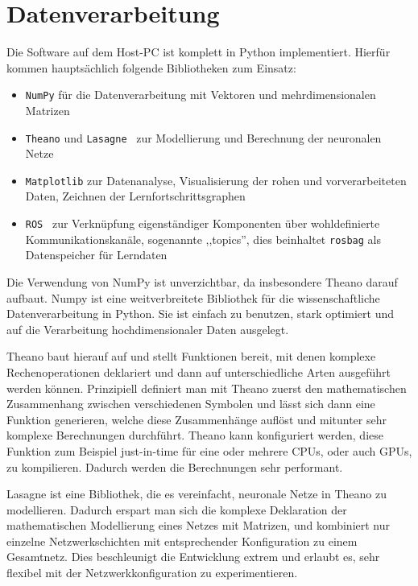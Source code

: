 \section{Datenverarbeitung}

Die Software auf dem Host-PC ist komplett in Python implementiert. Hierfür
kommen hauptsächlich folgende Bibliotheken zum Einsatz:

\begin{itemize}
    \item \texttt{NumPy} \citep{numpy} für die Datenverarbeitung mit Vektoren und
        mehrdimensionalen Matrizen
    \item \texttt{Theano} \citep{theano} und
        \texttt{Lasagne}~\cite{web:lasagne} zur Modellierung und Berechnung der
        neuronalen Netze
    \item \texttt{Matplotlib} \citep{matplotlib} zur Datenanalyse,
        Visualisierung der rohen und vorverarbeiteten Daten, Zeichnen der
        Lernfortschrittsgraphen
    \item \texttt{ROS}~\cite{web:ros} zur Verknüpfung eigenständiger Komponenten über
        wohldefinierte Kommunikationskanäle, sogenannte ,,topics'', dies beinhaltet
        \texttt{rosbag} als Datenspeicher für Lerndaten
\end{itemize}

Die Verwendung von NumPy ist unverzichtbar, da insbesondere
Theano darauf aufbaut. Numpy ist eine weitverbreitete Bibliothek für
die wissenschaftliche Datenverarbeitung in Python. Sie ist einfach zu benutzen,
stark optimiert und auf die Verarbeitung hochdimensionaler Daten ausgelegt.

Theano baut hierauf auf und stellt Funktionen bereit, mit denen
komplexe Rechenoperationen deklariert und dann auf unterschiedliche Arten
ausgeführt werden können. Prinzipiell definiert man mit Theano zuerst den
mathematischen Zusammenhang zwischen verschiedenen Symbolen und lässt sich dann
eine Funktion generieren, welche diese Zusammenhänge auflöst und mitunter sehr
komplexe Berechnungen durchführt. Theano kann konfiguriert werden, diese
Funktion zum Beispiel just-in-time für eine oder mehrere CPUs, oder auch GPUs,
zu kompilieren. Dadurch werden die Berechnungen sehr performant.

Lasagne ist eine Bibliothek, die es vereinfacht, neuronale Netze in Theano zu
modellieren. Dadurch erspart man sich die komplexe Deklaration der
mathematischen Modellierung eines Netzes mit Matrizen, und kombiniert nur
einzelne Netzwerkschichten mit entsprechender Konfiguration zu einem
Gesamtnetz. Dies beschleunigt die Entwicklung extrem und erlaubt es, sehr
flexibel mit der Netzwerkkonfiguration zu experimentieren.

